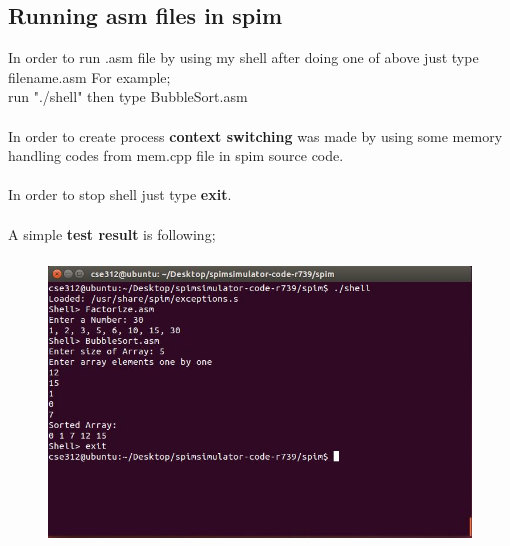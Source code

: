\documentclass{article}
\begin{document}
\subsection{Running asm files in spim}
In order to run .asm file by using my shell after doing one of above just type filename.asm
For example;\\
run "./shell" then type BubbleSort.asm \\ \\
In order to create process \textbf{context switching} was made by using some memory handling codes from mem.cpp file in spim source code. \\ \\
In order to stop shell just type \textbf{exit}.\\ \\
A simple \textbf{test result} is following;
\begin{figure}[H]
    \centering
	\includegraphics[width=6in, height=3in]{res.JPG}
	\caption[Optional caption]{}
	\label{}
\end{figure}                              
\end{document}
